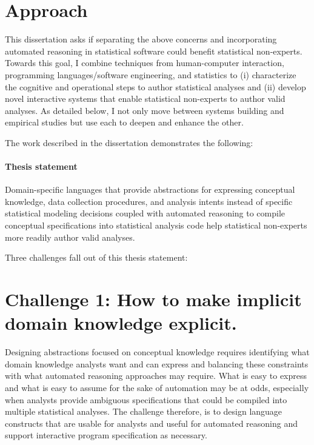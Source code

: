 \section*{Approach}
This dissertation asks if separating the above concerns and incorporating
automated reasoning in statistical software could benefit statistical
non-experts. Towards this goal, I combine techniques from human-computer
interaction, programming languages/software engineering, and statistics to (i)
characterize the cognitive and operational steps to author statistical analyses
and (ii) develop novel interactive systems that enable statistical non-experts
to author valid analyses. As detailed below, I not only move between systems
building and empirical studies but use each to deepen and enhance the other.

The work described in the dissertation demonstrates the following:%
\paragraph{Thesis statement}

Domain-specific languages that provide abstractions for expressing conceptual
knowledge, data collection procedures, and analysis intents instead of specific
statistical modeling decisions coupled with automated reasoning to compile
conceptual specifications into statistical analysis code help statistical
non-experts more readily author valid analyses. 

Three challenges fall out of this thesis statement: 

\section*{Challenge 1: How to make implicit domain knowledge explicit.} %
Designing abstractions focused on conceptual knowledge requires identifying what
domain knowledge analysts want and can express and balancing these constraints
with what automated reasoning approaches may require. What is easy to express
and what is easy to assume for the sake of automation may be at odds, especially
when analysts provide ambiguous specifications that could be compiled into
multiple statistical analyses. The challenge therefore, is to design language
constructs that are usable for analysts and useful for automated reasoning and
support interactive program specification as necessary.

